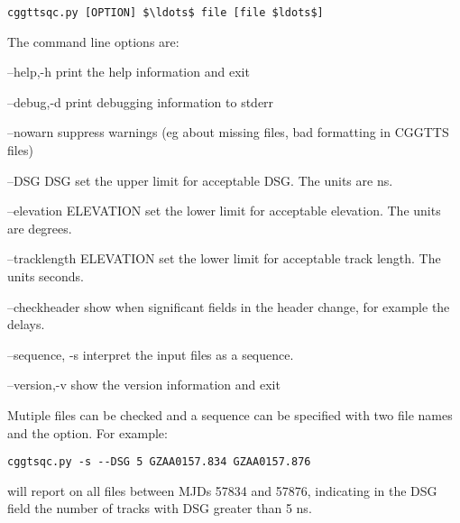 \begin{lstlisting}[mathescape=true]
cggttsqc.py [OPTION] $\ldots$ file [file $ldots$]
\end{lstlisting}
The command line options are:
\begin{description*}
	\item[--help,-h]	print the help information and exit
	\item[--debug,-d]	print debugging information to stderr
	\item[--nowarn]   suppress warnings (eg about missing files, bad formatting in CGGTTS files)
	\item[--DSG DSG]  set the upper limit for acceptable DSG. The units are ns.
	\item[--elevation ELEVATION] set the lower limit for acceptable elevation. The units are degrees.
	\item[--tracklength  ELEVATION] set the lower limit for acceptable track length. The units seconds.
	\item[--checkheader] show when significant fields in the header change, for example the delays.
	\item[--sequence, -s] interpret the input files as a sequence.
	\item[--version,-v] show the version information and exit
\end{description*}
Mutiple files can be checked and a sequence can be specified with two file names and the  option.
For example:
\begin{lstlisting}
cggtsqc.py -s --DSG 5 GZAA0157.834 GZAA0157.876
\end{lstlisting}
will report on all files between MJDs 57834 and 57876, indicating in the DSG field the number of tracks with DSG greater
than 5 ns.